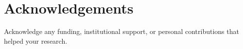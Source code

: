 \documentclass[a4paper,fleqn]{cas-dc}
\begin{document}
	
	\section*{Acknowledgements}
	Acknowledge any funding, institutional support, or personal contributions that helped your research.
	
	
	
	
	
\end{document}
